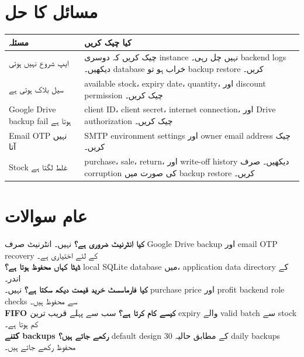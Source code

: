 \documentclass[12pt,a4paper]{article}
\begin{document}
\section{مسائل کا حل}
\begin{longtable}{>{\raggedright\arraybackslash}p{4cm}>{\raggedright\arraybackslash}p{9cm}}
\toprule
\textbf{مسئلہ} & \textbf{کیا چیک کریں} \\
\midrule
ایپ شروع نہیں ہوتی & چیک کریں کہ دوسری instance نہیں چل رہی۔ backend logs دیکھیں۔ database خراب ہو تو backup restore کریں۔ \\
سیل بلاک ہوتی ہے & available stock، expiry date، quantity، اور discount permission چیک کریں۔ \\
Google Drive backup fail ہوتا ہے & client ID، client secret، internet connection، اور Drive authorization چیک کریں۔ \\
Email OTP نہیں آتا & SMTP environment settings اور owner email address چیک کریں۔ \\
Stock غلط لگتا ہے & purchase، sale، return، اور write-off history دیکھیں۔ صرف corruption کی صورت میں backup restore کریں۔ \\
\bottomrule
\end{longtable}

\section{عام سوالات}
\textbf{کیا انٹرنیٹ ضروری ہے؟} نہیں۔ انٹرنیٹ صرف Google Drive backup اور email OTP recovery کے لئے اختیاری ہے۔\\[0.5em]
\textbf{ڈیٹا کہاں محفوظ ہوتا ہے؟} local SQLite database میں، application data directory کے اندر۔\\[0.5em]
\textbf{کیا فارماسسٹ خرید قیمت دیکھ سکتا ہے؟} نہیں۔ purchase price اور profit backend role checks سے محفوظ ہیں۔\\[0.5em]
\textbf{FIFO کیسے کام کرتا ہے؟} سب سے پہلے قریب ترین expiry والے valid batch سے stock کم ہوتا ہے۔\\[0.5em]
\textbf{کتنے backups رکھے جاتے ہیں؟} default design کے مطابق حالیہ 30 daily backups محفوظ رکھے جاتے ہیں۔
\end{document}
